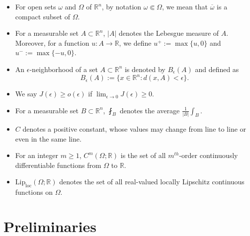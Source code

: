 \documentclass[11pt, notitlepage]{article}
\def\R{\mathbb{R}}
\begin{document}
{\begin{itemize}
     
    \item For open sets $\omega$ and $\Omega$ of $\mathbb{R}^n$, by notation $\omega\Subset\Omega$, we mean that $\overline{\omega}$ is a compact subset of $\Omega$.
    
    \item For a measurable set $A\subset\mathbb{R}^n$, $|A|$ denotes the Lebesgue measure of $A$. Moreover, for a function $u:A\to\R$, we define $u^+:=\max\{ u, 0\}$ and $u^-:=\max\{-u, 0\}.$ 

    \item An $\epsilon$-neighborhood of a set $A\subset\R^n$ is denoted by $B_\epsilon(A)$ and defined as $$B_\epsilon(A):=\{x\in\R^n: d(x,A)<\epsilon\}.$$ 

    \item We say $J(\epsilon)\geq o(\epsilon)$ if $\lim_{\epsilon\to 0} J(\epsilon)\geq 0$.
    
    \item For a measurable set $B\subset\R^n$, $\fint_B$ denotes the average $\frac{1}{|B|}\int_B.$
    
    \item $C$ denotes a positive constant, whose values may change from line to line or even in the same line.

    \item For an integer $m\geq 1$, $C^m(\Omega;\R)$ is the set of all $m^{th}$-order continuously differentiable functions from $\Omega$ to $\R$.

    \item $\mathrm{Lip}_{\mathrm{loc}}(\Omega;\R)$ denotes the set of all real-valued locally Lipschitz continuous functions on $\Omega$.
\end{itemize}
\section{Preliminaries}
}
\end{document}
